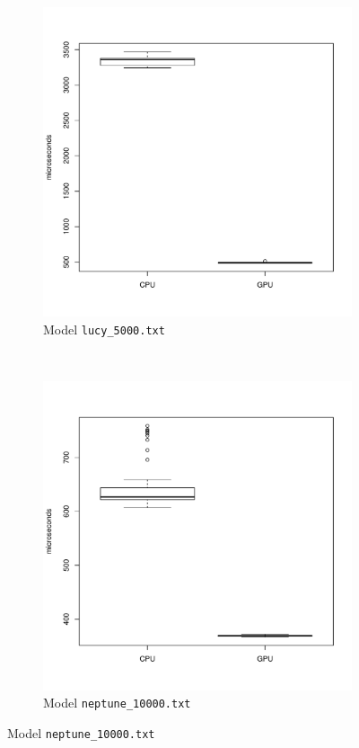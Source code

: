 	\begin{figure}
		\ContinuedFloat
		\center
		\begin{subfigure}[b]{0.45\textwidth}
			\includegraphics[width=\textwidth]{results/lucy_5000}
			\caption{Model \texttt{lucy\_5000.txt}}
		\end{subfigure}
		~%
		\begin{subfigure}[b]{0.45\textwidth}
			\includegraphics[width=\textwidth]{results/neptune_10000}
			\caption{Model \texttt{neptune\_10000.txt}}
		\end{subfigure}
		

\end{figure}

